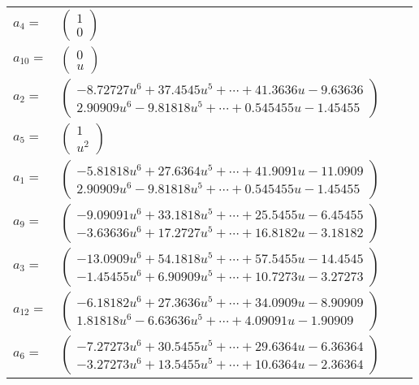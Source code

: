 \documentclass[1p]{elsarticle_modified}
\theoremstyle{definition}
\begin{document}
\begin{tabular}{m{7pt} m{180pt} m{7pt} m{180pt} }
\flushright $a_{4}=$&$\begin{pmatrix}1\\0\end{pmatrix}$ \\
\flushright $a_{10}=$&$\begin{pmatrix}0\\u\end{pmatrix}$ \\
\flushright $a_{2}=$&$\begin{pmatrix}-8.72727 u^{6}+37.4545 u^{5}+\cdots+41.3636 u-9.63636\\2.90909 u^{6}-9.81818 u^{5}+\cdots+0.545455 u-1.45455\end{pmatrix}$ \\
\flushright $a_{5}=$&$\begin{pmatrix}1\\u^2\end{pmatrix}$ \\
\flushright $a_{1}=$&$\begin{pmatrix}-5.81818 u^{6}+27.6364 u^{5}+\cdots+41.9091 u-11.0909\\2.90909 u^{6}-9.81818 u^{5}+\cdots+0.545455 u-1.45455\end{pmatrix}$ \\
\flushright $a_{9}=$&$\begin{pmatrix}-9.09091 u^{6}+33.1818 u^{5}+\cdots+25.5455 u-6.45455\\-3.63636 u^{6}+17.2727 u^{5}+\cdots+16.8182 u-3.18182\end{pmatrix}$ \\
\flushright $a_{3}=$&$\begin{pmatrix}-13.0909 u^{6}+54.1818 u^{5}+\cdots+57.5455 u-14.4545\\-1.45455 u^{6}+6.90909 u^{5}+\cdots+10.7273 u-3.27273\end{pmatrix}$ \\
\flushright $a_{12}=$&$\begin{pmatrix}-6.18182 u^{6}+27.3636 u^{5}+\cdots+34.0909 u-8.90909\\1.81818 u^{6}-6.63636 u^{5}+\cdots+4.09091 u-1.90909\end{pmatrix}$ \\
\flushright $a_{6}=$&$\begin{pmatrix}-7.27273 u^{6}+30.5455 u^{5}+\cdots+29.6364 u-6.36364\\-3.27273 u^{6}+13.5455 u^{5}+\cdots+10.6364 u-2.36364\end{pmatrix}$ \\

\end{tabular}
\end{document}
